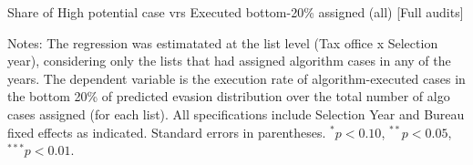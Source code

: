 \documentclass{article}
\newcommand{\OutPath}{Output/}%
\newcommand{\OutPath}{../Output/}%
\begin{document}
\begin{landscape}
\begin{table}[H]\centering
\begin{adjustbox}{max width=1.255\textwidth}
\begin{threeparttable}
\caption{Share of High potential case vrs Executed bottom-20\% \/ assigned (all) [Full audits]}
\label{tab:inspector_effort_disc_full}
\footnotesize


\begin{tablenotes}[flushleft]
\footnotesize
\item Notes: The regression was estimatated at the list level (Tax office x Selection year), considering only the lists that had assigned algorithm cases in any of the years. The dependent variable is the execution rate of algorithm-executed cases in the bottom 20\% of predicted evasion distribution over the total number of algo cases assigned (for each list). All specifications include Selection Year and Bureau fixed effects as indicated. Standard errors in parentheses. 
$^{*}p<0.10$, $^{**}p<0.05$, $^{***}p<0.01$.
\end{tablenotes}
\end{threeparttable}
\end{adjustbox}
\end{table}



\end{landscape}
\end{document}
